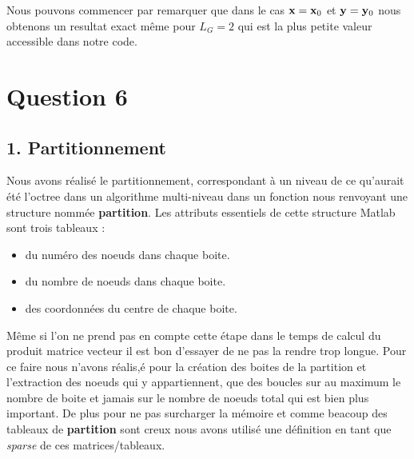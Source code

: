 \documentclass[10pt]{article}
\begin{document}
\begin{multicols}{2}

Nous pouvons commencer par remarquer que dans le cas ${\bf x}={\bf x}_0$ et ${\bf y}={\bf y}_0$ nous obtenons un resultat exact même pour $L_G=2$ qui est la plus petite valeur accessible dans notre code.  

\vspace*{22pt}


\section*{Question 6}

\subsection*{1. Partitionnement}

Nous avons réalisé le partitionnement, correspondant à un niveau de ce qu'aurait été l'octree dans un algorithme multi-niveau dans un fonction nous renvoyant une structure nommée \textbf{partition}. Les attributs essentiels de cette structure Matlab sont trois tableaux : \\

\begin{itemize}
\item du numéro des noeuds dans chaque boite. 
\item du nombre de noeuds dans chaque boite.
\item des coordonnées du centre de chaque boite. 
\end{itemize}

\vspace*{10pt}
Même si l'on ne prend pas en compte cette étape dans le temps de calcul du produit matrice vecteur il est bon d'essayer de ne pas la rendre trop longue. Pour ce faire nous n'avons réalis,é pour la création des boites de la partition et l'extraction des noeuds qui y appartiennent, que des boucles sur au maximum le nombre de boite et jamais sur le nombre de noeuds total qui est bien plus important. De plus pour ne pas surcharger la mémoire et comme beacoup des tableaux de \textbf{partition} sont creux nous avons utilisé une définition en tant que \textit{sparse} de ces matrices/tableaux. \\




\end{multicols}
\end{document}
